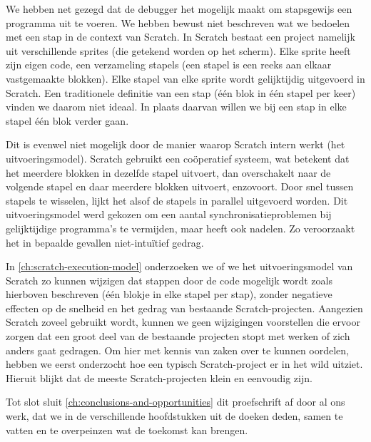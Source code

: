 \documentclass[main]{subfiles}
\begin{document}
We hebben net gezegd dat de debugger het mogelijk maakt om stapsgewijs een programma uit te voeren.
We hebben bewust niet beschreven wat we bedoelen met een stap in de context van Scratch.
In Scratch bestaat een project namelijk uit verschillende sprites (die getekend worden op het scherm).
Elke sprite heeft zijn eigen code, een verzameling stapels (een stapel is een reeks aan elkaar vastgemaakte blokken).
Elke stapel van elke sprite wordt gelijktijdig uitgevoerd in Scratch.
Een traditionele definitie van een stap (één blok in één stapel per keer) vinden we daarom niet ideaal.
In plaats daarvan willen we bij een stap in elke stapel één blok verder gaan.

Dit is evenwel niet mogelijk door de manier waarop Scratch intern werkt (het uitvoeringsmodel).
Scratch gebruikt een coöperatief systeem, wat betekent dat het meerdere blokken in dezelfde stapel uitvoert, dan overschakelt naar de volgende stapel en daar meerdere blokken uitvoert, enzovoort.
Door snel tussen stapels te wisselen, lijkt het alsof de stapels in parallel uitgevoerd worden.
Dit uitvoeringsmodel werd gekozen om een aantal synchronisatieproblemen bij gelijktijdige programma's te vermijden, maar heeft ook nadelen.
Zo veroorzaakt het in bepaalde gevallen niet-intuïtief gedrag.

In \cref{ch:scratch-execution-model} onderzoeken we of we het uitvoeringsmodel van Scratch zo kunnen wijzigen dat stappen door de code mogelijk wordt zoals hierboven beschreven (één blokje in elke stapel per stap), zonder negatieve effecten op de snelheid en het gedrag van bestaande Scratch-projecten.
Aangezien Scratch zoveel gebruikt wordt, kunnen we geen wijzigingen voorstellen die ervoor zorgen dat een groot deel van de bestaande projecten stopt met werken of zich anders gaat gedragen.
Om hier met kennis van zaken over te kunnen oordelen, hebben we eerst onderzocht hoe een typisch Scratch-project er in het wild uitziet.
Hieruit blijkt dat de meeste Scratch-projecten klein en eenvoudig zijn.

Tot slot sluit \cref{ch:conclusions-and-opportunities} dit proefschrift af door al ons werk, dat we in de verschillende hoofdstukken uit de doeken deden, samen te vatten en te overpeinzen wat de toekomst kan brengen.

\end{document}
